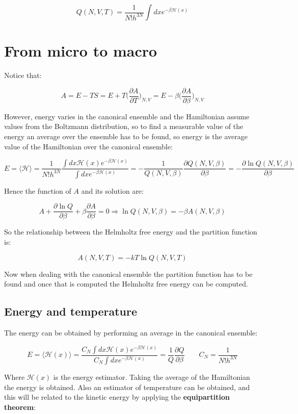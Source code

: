 		$$Q(N, V, T) = \frac{1}{N!h^{3N}}\int dx e^{-\beta\mathcal{H}(x)}$$

\section{From micro to macro}
Notice that:

$$A = E-TS = E+T\biggl(\frac{\partial A}{\partial T}\biggr)_{N, V} = E-\beta\biggl(\frac{\partial A}{\partial \beta}\biggr)_{N, V}$$

However, energy varies in the canonical ensemble and the Hamiltonian assume values from the Boltzmann distribution, so to find a measurable value of the energy an average over the ensemble has to be found, so energy is the average value of the Hamiltonian over the canonical ensemble:

$$E = \langle\mathcal{H}\rangle = \frac{1}{N!h^{3N}}\frac{\int dx\mathcal{H}(x)e^{-\beta\mathcal{H}(x)}}{\int dx e^{-\beta\mathcal{H}(x)}} = -\frac{1}{Q(N, V, \beta)}\frac{\partial Q(N, V, \beta)}{\partial \beta} = -\frac{\partial\ln Q(N, V, \beta)}{\partial \beta}$$

Hence the function of $A$ and its solution are:

$$A + \frac{\partial \ln Q}{\partial \beta} +\beta\frac{\partial A}{\partial \beta} = 0\Rightarrow \ln Q(N, V, \beta)  = -\beta A(N, V, \beta)$$

So the relationship between the Helmholtz free energy and the partition function is:

$$A(N, V, T) = -kT\ln Q(N, V, T)$$

Now when dealing with the canonical ensemble the partition function has to be found and once that is computed the Helmholtz free energy can be computed.

	\subsection{Energy and temperature}
	The energy can be obtained by performing an average in the canonical ensemble:

	$$E = \langle\mathcal{H}(x)\rangle = \frac{C_N\int dx\mathcal{H}(x)e^{-\beta\mathcal{H}(x)}}{C_N\int dxe^{-\beta\mathcal{H}(x)}} = \frac{1}{Q}\frac{\partial Q}{\partial \beta}\qquad C_N=\frac{1}{N!h^{3N}}$$

	Where $\mathcal{H}(x)$ is the energy estimator.
	Taking the average of the Hamiltonian the energy is obtained.
	Also an estimator of temperature can be obtained, and this will be related to the kinetic energy by applying the \textbf{equipartition theorem}:

